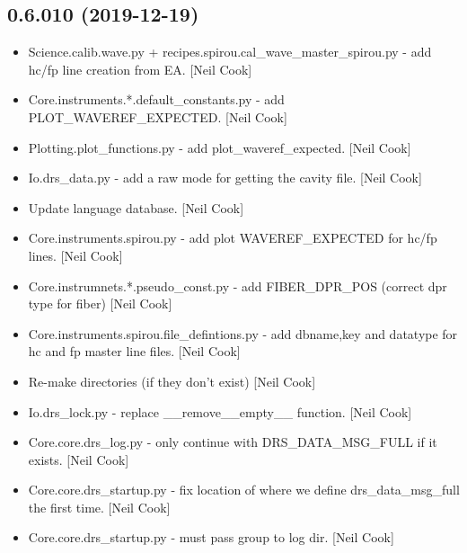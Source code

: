 \documentclass[a4paper,10pt,english]{report}
\begin{document}
\subsection{0.6.010 (2019-12-19)}
\label{\detokenize{misc/changelog:id7}}\begin{itemize}
\item {} 
Science.calib.wave.py + recipes.spirou.cal\_wave\_master\_spirou.py - add
hc/fp line creation from EA. {[}Neil Cook{]}

\item {} 
Core.instruments.*.default\_constants.py - add PLOT\_WAVEREF\_EXPECTED.
{[}Neil Cook{]}

\item {} 
Plotting.plot\_functions.py - add plot\_waveref\_expected. {[}Neil Cook{]}

\item {} 
Io.drs\_data.py - add a raw mode for getting the cavity file. {[}Neil
Cook{]}

\item {} 
Update language database. {[}Neil Cook{]}

\item {} 
Core.instruments.spirou.py - add plot WAVEREF\_EXPECTED for hc/fp
lines. {[}Neil Cook{]}

\item {} 
Core.instrumnets.*.pseudo\_const.py - add FIBER\_DPR\_POS (correct dpr
type for fiber) {[}Neil Cook{]}

\item {} 
Core.instruments.spirou.file\_defintions.py - add dbname,key and
datatype for hc and fp master line files. {[}Neil Cook{]}

\item {} 
Re-make directories (if they don’t exist) {[}Neil Cook{]}

\item {} 
Io.drs\_lock.py - replace \_\_remove\_\_empty\_\_ function. {[}Neil Cook{]}

\item {} 
Core.core.drs\_log.py - only continue with DRS\_DATA\_MSG\_FULL if it
exists. {[}Neil Cook{]}

\item {} 
Core.core.drs\_startup.py - fix location of where we define
drs\_data\_msg\_full the first time. {[}Neil Cook{]}

\item {} 
Core.core.drs\_startup.py - must pass group to log dir. {[}Neil Cook{]}


\end{itemize}
\end{document}
